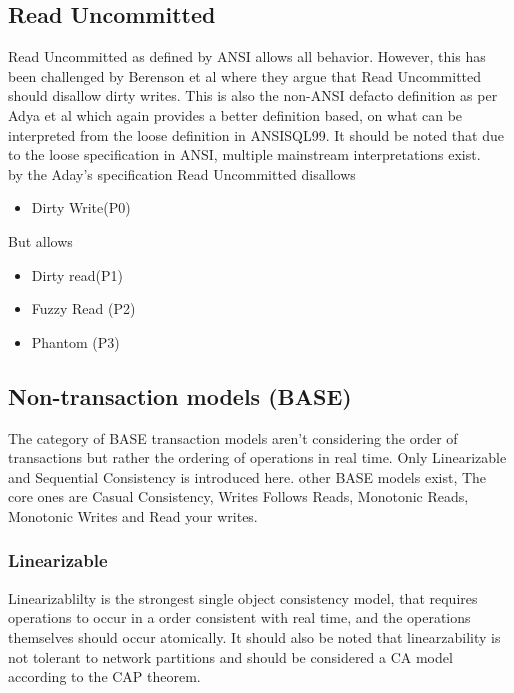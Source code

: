 \documentclass[a4paper,10pt,titlepage]{report}
\begin{document}

\subsection{Read Uncommitted}
Read Uncommitted as defined by ANSI allows all behavior. However, this has been challenged by Berenson et al\cite{Berensonetal} where they argue that Read Uncommitted should disallow dirty writes. This is also the non-ANSI defacto definition as per Adya et al \cite{Adya99weakconsistency} which again provides a better definition based, on what can be interpreted from the loose definition in ANSISQL99\cite{ansisql1999}. It should be noted that due to the loose specification in ANSI, multiple mainstream interpretations exist.\\

by the Aday's specification Read Uncommitted disallows
\begin{itemize}
    \item Dirty Write(P0)
\end{itemize}
But allows
\begin{itemize}
    \item Dirty read(P1)
    \item Fuzzy Read (P2)
    \item Phantom (P3)
\end{itemize}

\subsection{Non-transaction models (BASE)}
The category of BASE transaction models aren't considering the order of transactions but rather the ordering of operations in real time. Only Linearizable and Sequential Consistency is introduced here. other BASE models exist, The core ones are Casual Consistency, Writes Follows Reads, Monotonic Reads, Monotonic Writes and Read your writes.

\subsubsection{Linearizable}
Linearizablilty is the strongest single object consistency model, that requires operations to occur in a order consistent with real time, and the operations themselves should occur atomically. It should also be noted that linearzability is not tolerant to network partitions and should be considered a CA model according to the CAP theorem.
\end{document}
